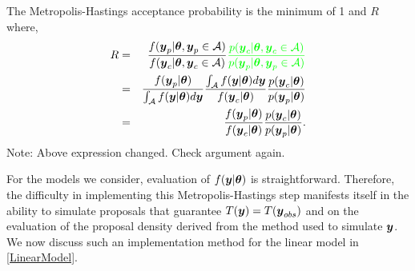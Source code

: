 \documentclass[12pt]{article}
\def\bth{\mbox{\boldmath $\theta$}}
\newcommand{\by}{\mbox{\boldmath $y$}}
\newcommand{\red}[1]{{\color{red}#1}}
\newcommand{\green}[1]{{\color{green}#1}}
\begin{document}
The Metropolis-Hastings acceptance probability  is the minimum of 1 and $R$ where,
\begin{eqnarray}
\label{MHRatio}
R & = & \frac{f(\by_p|\bth,\by_p \in \mathcal{A})}{f(\by_c|\bth,\by_c \in \mathcal{A})}  
                \green{\frac{p(\by_c|\bth, \by_c \in \mathcal{A})}{p(\by_p|\bth,\by_p \in \mathcal{A})}} \\
  & = & \frac{f(\by_p | \bth)}{\int_\mathcal{A} f(\by | \bth) d\by} \frac{\int_\mathcal{A} f(\by | \bth) d\by}{f(\by_c | \bth)} \frac{p(\by_c | \bth)}{p(\by_p | \bth)} \\
 & = & \frac{f(\by_p|\bth)}{f(\by_c|\bth)} \frac{p(\by_c|\bth)}{p(\by_p|\bth)} .  
\end{eqnarray}
\green{Note:  Above expression changed.  Check argument again.}

For the models we consider, evaluation of $f(\by | \bth)$ is straightforward.  Therefore, the difficulty in implementing this Metropolis-Hastings step manifests  itself in the ability to simulate proposals that guarantee $T(\by) = T(\by_{obs})$ and on the evaluation of the proposal density derived from the method used to simulate $\by$. We now discuss such an implementation method for the linear model in \eqref{LinearModel}.
\end{document}
